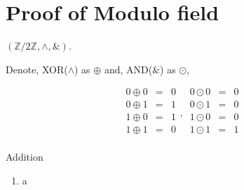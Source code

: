 \documentclass[a4paper,12pt]{article}
\begin{document}
\appendix

\section{Proof of Modulo field}
\label{appendix:modulo_field}

$(\mathbb{Z}/2\mathbb{Z} ,\wedge , \&)$.

Denote, XOR($\wedge$) as $\oplus$ and, AND($\&$) as $\odot$,

\begin{equation}
    \begin{matrix}
        0 \oplus 0 & = &0\\
        0 \oplus 1 & = &1\\
        1 \oplus 0 & = &1\\
        1 \oplus 1 & = &0\\
    \end{matrix},\,
    \begin{matrix}
        0 \odot 0 & = &0\\
        0 \odot 1 & = &0\\
        1 \odot 0 & = &0\\
        1 \odot 1 & = &1\\
    \end{matrix}
\end{equation}

Addition 

\begin{enumerate}
    \item a
\end{enumerate}

  
  
\end{document}
